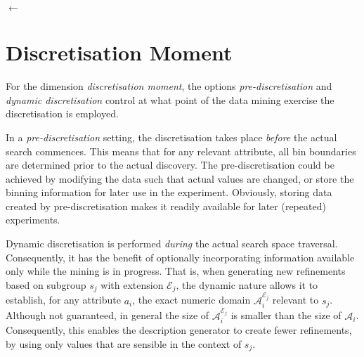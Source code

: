 \documentclass[smallextended]{svjour3}
\newcommand{\extension}[1]{\mathcal{E}_{#1}}
\newcommand{\dimension}{\emph}
\newcommand{\parameter}{\emph}
\newcommand{\dyndis}{\parameter{dynamic discretisation}}
\newcommand{\predis}{\parameter{pre-discretisation}}
\begin{document}
\begin{algorithm}
{		\ForEach {\Refinement $\in$ \RefinementSet} {
			\Quality $\leftarrow$ \QualityMeasure{\Refinement}\;
			\AddToResultSet{\SearchConstraints, \ResultSet, \Refinement, \Quality}            {\label{sd:ar}} \;%
			\AddToCandidateSet{\SearchConstraints, \CandidateSet, \Refinement, \Quality}      {\label{sd:ac}} \;%
		}
	}
	\Return \ResultSet
\end{algorithm}





\section{Discretisation Moment}
\label{section:discretisation-moment}

For the dimension \dimension{discretisation moment}, the options \predis{} and \dyndis{} control at what point of the data mining exercise the discretisation is employed.

In a \predis{} setting, the discretisation takes place \emph{before} the actual search commences.
This means that for any relevant attribute, all bin boundaries are determined prior to the actual discovery.
The pre-discretisation could be achieved by modifying the data such that actual values are changed, or store the binning information for later use in the experiment.
Obviously, storing data created by pre-discretisation makes it readily available for later (repeated) experiments.

Dynamic discretisation is performed \emph{during} the actual search space traversal.
Consequently, it has the benefit of optionally incorporating information available only while the mining is in progress.
That is, when generating new refinements based on subgroup $s_j$ with extension $\extension{j}$, the dynamic nature allows it to establish, for any attribute $a_i$, the exact numeric domain $\mathcal{A}_i^{\extension{j}}$ relevant to $s_j$.
Although not guaranteed, in general the size of $\mathcal{A}_i^{\extension{j}}$ is smaller than the size of $\mathcal{A}_i$.
Consequently, this enables the description generator to create fewer refinements, by using only values that are sensible in the context of $s_j$.
\end{document}
